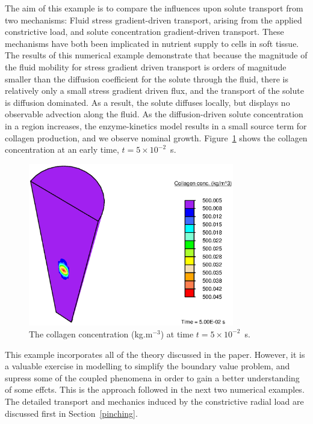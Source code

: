 The aim of this example is to compare the influences upon solute
transport from two mechanisms: Fluid stress gradient-driven transport,
arising from the applied constrictive load, and solute concentration
gradient-driven transport. These mechanisms have both been implicated
in nutrient supply to cells in soft tissue. The results of this
numerical example demonstrate that because the magnitude of the fluid mobility
for stress gradient driven transport is orders of magnitude
smaller than the diffusion coefficient for the solute through the
fluid, there is relatively only a small stress gradient driven flux,
and the transport of the solute is diffusion dominated. As a result,
the solute diffuses locally, but displays no
observable advection along the fluid. As the diffusion-driven solute
concentration in a region increases, the enzyme-kinetics model
results in a small source term for collagen production, and we observe nominal
growth. Figure~\ref{eg3conc} shows the collagen concentration at an
early time, $t=5\times10^{-2}$~s.

\begin{figure}[!hpt]
\centering
\includegraphics[width=0.8\textwidth]{images/examples/lagrangian/medication/final-collagen-concentration}
\caption{The collagen concentration (kg.m$^{-3}$) at time
  $t=5\times10^{-2}$~s.}
\label{eg3conc}
\end{figure}

This example incorporates all of the theory discussed in the
paper. However, it is a valuable exercise in
modelling to simplify the boundary value problem, and supress some of
the coupled phenomena in order to gain a better understanding of some
effcts. This is the approach followed in the next two numerical
examples. The detailed transport and mechanics induced by the
constrictive radial load are discussed first in Section~\ref{pinching}. 

